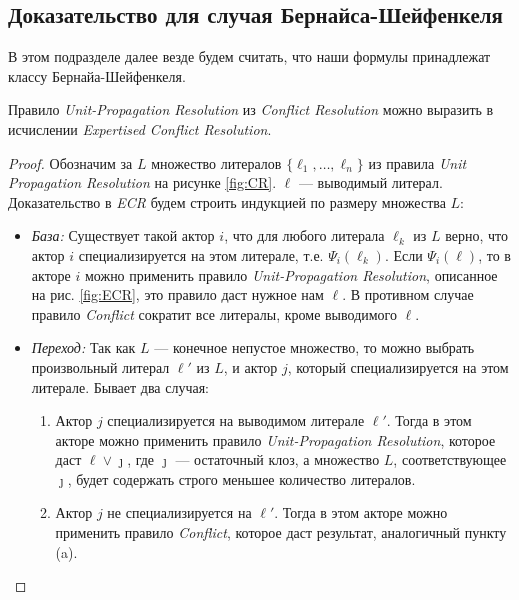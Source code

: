 \subsection{Доказательство для случая Бернайса-Шейфенкеля}
\label{sec:bsh-proof}
В этом подразделе далее везде будем считать, что наши формулы принадлежат классу Бернайа-Шейфенкеля. 


\begin{lemma}
\label{lem:upr}
Правило \emph{Unit-Propagation Resolution} из \emph{Conflict Resolution} можно выразить в исчислении \emph{Expertised Conflict Resolution}.
\end{lemma}
\begin{proof}
Обозначим за $L$ множество литералов $\{\ell_1, \ldots, \ell_n\}$ из правила \emph{Unit Propagation Resolution} на рисунке \ref{fig:CR}. $\ell$ --- выводимый литерал.
Доказательство в \emph{ECR} будем строить индукцией по размеру множества $L$:
\begin{itemize}[label=$\star$]
	\item \emph{База:} Существует такой актор $i$, что для любого литерала $\ell_k$ из $L$ верно, что актор $i$ специализируется на этом литерале, т.е. $\Psi_i(\ell_k)$. Если $\Psi_i(\ell)$, то в акторе $i$ можно применить правило \emph{Unit-Propagation Resolution}, описанное на рис. \ref{fig:ECR}, это правило даст нужное нам $\ell$. В противном случае правило \emph{Conflict} сократит все литералы, кроме выводимого $\ell$.
    \item \emph{Переход:} Так как $L$ --- конечное непустое множество, то можно выбрать произвольный литерал $\ell'$ из $L$, и актор $j$, который специализируется на этом литерале. Бывает два случая:
    \begin{enumerate}
    	\item Актор $j$ специализируется на выводимом литерале $\ell'$. Тогда в этом акторе можно применить правило \emph{Unit-Propagation Resolution}, которое даст $\ell \vee \jmath$, где $\jmath$ --- остаточный клоз, а множество $L$, соответствующее $\jmath$, будет содержать строго меньшее количество литералов.
        \item Актор $j$ не специализируется на $\ell'$. Тогда в этом акторе можно применить правило \emph{Conflict}, которое даст результат, аналогичный пункту (a).
    \end{enumerate} 
\end{itemize}
\end{proof}


